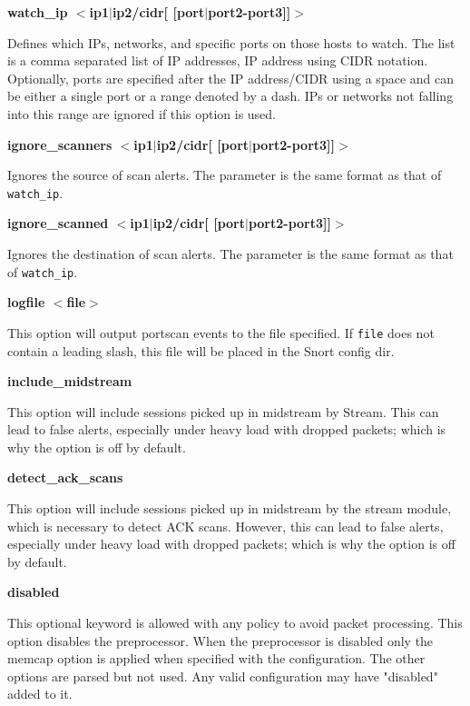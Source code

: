 \documentclass[english]{report}
\newcounter{slistnum}
\newenvironment{slist}
{ \begin{list}{ {\bf \arabic{slistnum}.} }{\usecounter{slistnum} } }
{ \end{list} }
\begin{document}
\begin{slist}
\begin{itemize}
\end{itemize}

\item \textbf{watch\_ip $<$ip1$|$ip2/cidr[ [port$|$port2-port3]]$>$ }

Defines which IPs, networks, and specific ports on those hosts to watch.  The
list is a comma separated list of IP addresses, IP address using CIDR notation.
Optionally, ports are specified after the IP address/CIDR using a space and can
be either a single port or a range denoted by a dash.  IPs or networks not
falling into this range are ignored if this option is used.

\item \textbf{ignore\_scanners $<$ip1$|$ip2/cidr[ [port$|$port2-port3]]$>$ }

Ignores the source of scan alerts.  The parameter is the same format as that of
\texttt{watch\_ip}.

\item \textbf{ignore\_scanned $<$ip1$|$ip2/cidr[ [port$|$port2-port3]]$>$ }

Ignores the destination of scan alerts.  The parameter is the same format as
that of \texttt{watch\_ip}.

\item \textbf{logfile $<$file$>$ } 

This option will output portscan events to the file specified. If \texttt{file}
does not contain a leading slash, this file will be placed in the Snort config
dir.

\item \textbf{include\_midstream}

This option will include sessions picked up in midstream by Stream.
This can lead to false alerts, especially under heavy load with dropped
packets; which is why the option is off by default.

\item \textbf{detect\_ack\_scans}

This option will include sessions picked up in midstream by the stream module,
which is necessary to detect ACK scans.  However, this can lead to false
alerts, especially under heavy load with dropped packets; which is why the
option is off by default.

\item \textbf{disabled}

This optional keyword is allowed with any policy to avoid packet processing.
This option disables the preprocessor. When the preprocessor is disabled
only the memcap option is applied when specified with the configuration.
The other options are parsed but not used. Any valid configuration may have
"disabled" added to it.

\end{slist}
\end{document}
